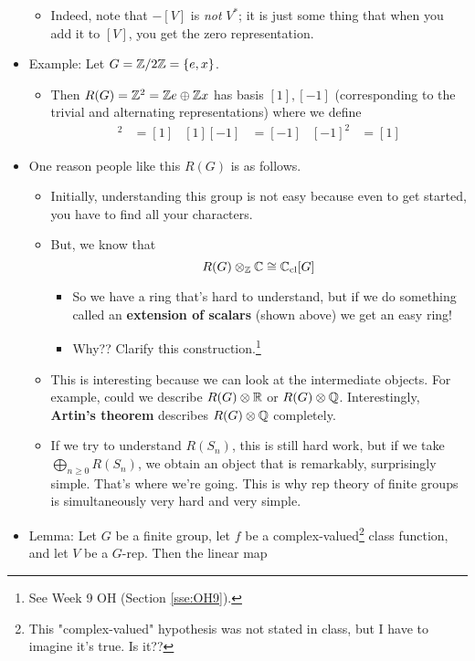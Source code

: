 \documentclass[../notes.tex]{subfiles}
\begin{document}
\begin{itemize}
\begin{itemize}
        \item Indeed, note that $-[V]$ is \emph{not} $V^*$; it is just some thing that when you add it to $[V]$, you get the zero representation.
    \end{itemize}
    \item Example: Let $G=\mathbb{Z}/2\mathbb{Z}=\{e,x\}$.
    \begin{itemize}
        \item Then $R(G)=\mathbb{Z}^2=\mathbb{Z} e\oplus\mathbb{Z} x$ has basis $[1],[-1]$ (corresponding to the trivial and alternating representations) where we define
        \begin{align*}
            [1]^2 &= [1]&
            [1][-1] &= [-1]&
            [-1]^2 &= [1]
        \end{align*}
    \end{itemize}
    \item One reason people like this $R(G)$ is as follows.
    \begin{itemize}
        \item Initially, understanding this group is not easy because even to get started, you have to find all your characters.
        \item But, we know that
        \begin{equation*}
            R(G)\otimes_{\mathbb{Z}}\mathbb{C} \cong \mathbb{C}_\text{cl}[G]
        \end{equation*}
        \begin{itemize}
            \item So we have a ring that's hard to understand, but if we do something called an \textbf{extension of scalars} (shown above) we get an easy ring!
            \item Why?? Clarify this construction.\footnote{See Week 9 OH (Section \ref{sse:OH9}).}
        \end{itemize}
        \item This is interesting because we can look at the intermediate objects. For example, could we describe $R(G)\otimes\mathbb{R}$ or $R(G)\otimes\mathbb{Q}$. Interestingly, \textbf{Artin's theorem} describes $R(G)\otimes\mathbb{Q}$ completely.
        \item If we try to understand $R(S_n)$, this is still hard work, but if we take $\bigoplus_{n\geq 0}R(S_n)$, we obtain an object that is remarkably, surprisingly simple. That's where we're going. This is why rep theory of finite groups is simultaneously very hard and very simple.
    \end{itemize}
    \item Lemma: Let $G$ be a finite group, let $f$ be a complex-valued\footnote{This "complex-valued" hypothesis was not stated in class, but I have to imagine it's true. Is it??} class function, and let $V$ be a $G$-rep. Then the linear map

\end{itemize}
\end{document}
